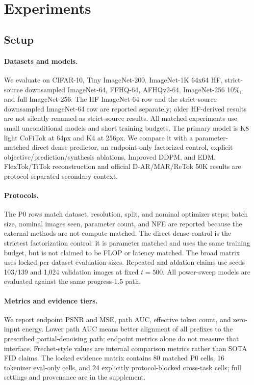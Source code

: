 \documentclass[letterpaper]{article}
\newcommand{\method}{CoFiTok}
\begin{document}
\section{Experiments}

\subsection{Setup}

\paragraph{Datasets and models.}
We evaluate on CIFAR-10, Tiny ImageNet-200,
ImageNet-1K 64x64 HF, strict-source downsampled ImageNet-64, FFHQ-64,
AFHQv2-64, ImageNet-256 10\%, and full ImageNet-256. The HF ImageNet-64 row
and the strict-source downsampled ImageNet-64 row are reported separately; older
HF-derived results are not silently renamed as strict-source results.
All matched experiments use small unconditional models and short training
budgets. The primary model is K8 light \method{} at 64px and K4 at 256px. We
compare it with a parameter-matched direct dense predictor, an endpoint-only
factorized control, explicit objective/prediction/synthesis ablations, Improved
DDPM, and EDM. FlexTok/TiTok reconstruction and official D-AR/MAR/ReTok 50K
results are protocol-separated secondary context.

\paragraph{Protocols.}
The P0 rows match dataset, resolution, split, and nominal optimizer steps;
batch size, nominal images seen, parameter count, and NFE are reported because
the external methods are not compute matched. The direct dense control is the
strictest factorization control: it is parameter matched and uses the same
training budget, but is not claimed to be FLOP or latency matched.
The broad matrix uses locked per-dataset evaluation sizes. Repeated and
ablation claims use seeds 103/139 and 1,024 validation images at fixed $t=500$.
All power-sweep models are evaluated against the same progress-$1.5$ path.

\paragraph{Metrics and evidence tiers.}
We report endpoint PSNR and MSE, path AUC, effective token count, and zero-input
energy. Lower path AUC means better alignment of all prefixes
to the prescribed partial-denoising path; endpoint metrics alone do not measure
that interface. Frechet-style values are internal comparison metrics rather
than SOTA FID claims. The locked evidence matrix contains 80 matched P0 cells,
16 tokenizer eval-only cells, and 24 explicitly protocol-blocked cross-task
cells; full settings and provenance are in the supplement.
\end{document}
